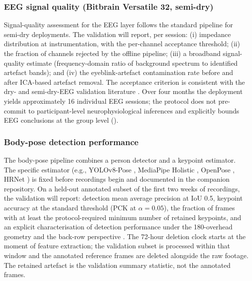 \subsubsection{EEG signal quality (Bitbrain Versatile 32, semi-dry)}\label{subsec:val-eeg}

Signal-quality assessment for the EEG layer follows the standard pipeline for semi-dry deployments. The validation will report, per session: (i) impedance distribution at instrumentation, with the per-channel acceptance threshold; (ii) the fraction of channels rejected by the offline pipeline; (iii) a broadband signal-quality estimate (frequency-domain ratio of background spectrum to identified artefact bands); and (iv) the eyeblink-artefact contamination rate before and after ICA-based artefact removal. The acceptance criterion is consistent with the dry- and semi-dry-EEG validation literature \parencite{LopezGordo2014_dry_eeg,DiFlumeri2019_dry_eeg_validation,Hinrichs2020_motion_artifacts,LauZhu2019_mobile_eeg_review}. Over four months the deployment yields approximately 16 individual EEG sessions; the protocol does not pre-commit to participant-level neurophysiological inferences and explicitly bounds EEG conclusions at the group level ().

\subsubsection{Body-pose detection performance}\label{subsec:val-vision}

The body-pose pipeline combines a person detector and a keypoint estimator. The specific estimator (e.g., YOLOv8-Pose \parencite{Jocher2023_yolov8}, MediaPipe Holistic \parencite{Lugaresi2019_mediapipe}, OpenPose \parencite{Cao2021_openpose}, HRNet \parencite{Sun2019_hrnet}) is fixed before recordings begin and documented in the companion repository. On a held-out annotated subset of the first two weeks of recordings, the validation will report: detection mean average precision at IoU 0.5, keypoint accuracy at the standard threshold (PCK at $\alpha = 0.05$), the fraction of frames with at least the protocol-required minimum number of retained keypoints, and an explicit characterisation of detection performance under the 180\textdegree-overhead geometry and the back-row perspective \parencite{Ahuja2019_edusense}. The 72-hour deletion clock starts at the moment of feature extraction; the validation subset is processed within that window and the annotated reference frames are deleted alongside the raw footage. The retained artefact is the validation summary statistic, not the annotated frames.

